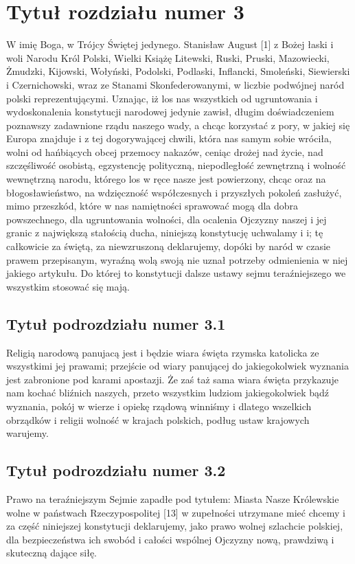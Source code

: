 \documentclass[12pt,a4paper]{article}
\begin{document}
\section{Tytuł rozdziału numer 3}
W imię Boga, w Trójcy Świętej jedynego. Stanisław August [1] z Bożej łaski i woli Narodu Król Polski, Wielki
Książę Litewski, Ruski, Pruski, Mazowiecki, Żmudzki, Kijowski, Wołyński, Podolski, Podlaski, Inflancki,
Smoleński, Siewierski i Czernichowski, wraz ze Stanami Skonfederowanymi, w liczbie podwójnej naród polski
reprezentującymi.
Uznając, iż los nas wszystkich od ugruntowania i wydoskonalenia konstytucji narodowej jedynie zawisł, długim
doświadczeniem poznawszy zadawnione rządu naszego wady, a chcąc korzystać z pory, w jakiej się Europa
znajduje i z tej dogorywającej chwili, która nas samym sobie wróciła, wolni od hańbiących obcej przemocy
nakazów, ceniąc drożej nad życie, nad szczęśliwość osobistą, egzystencję polityczną, niepodległość zewnętrzną i
wolność wewnętrzną narodu, którego los w ręce nasze jest powierzony, chcąc oraz na błogosławieństwo, na
wdzięczność współczesnych i przyszłych pokoleń zasłużyć, mimo przeszkód, które w nas namiętności
sprawować mogą dla dobra powszechnego, dla ugruntowania wolności, dla ocalenia Ojczyzny naszej i jej granic
z największą stałością ducha, niniejszą konstytucję uchwalamy i i; tę całkowicie za świętą, za niewzruszoną
deklarujemy, dopóki by naród w czasie prawem przepisanym, wyraźną wolą swoją nie uznał potrzeby
odmienienia w niej jakiego artykułu.
Do której to konstytucji dalsze ustawy sejmu teraźniejszego we wszystkim stosować się mają. 

\subsection{Tytuł podrozdziału numer 3.1}
Religią narodową panujacą jest i będzie wiara święta rzymska katolicka ze wszystkimi jej prawami; przejście od
wiary panującej do jakiegokolwiek wyznania jest zabronione pod karami apostazji. Że zaś taż sama wiara święta
przykazuje nam kochać bliźnich naszych, przeto wszystkim ludziom jakiegokolwiek bądź wyznania, pokój w
wierze i opiekę rządową winniśmy i dlatego wszelkich obrządków i religii wolność w krajach polskich, podług
ustaw krajowych warujemy. 


\subsection{Tytuł podrozdziału numer 3.2}
Prawo na teraźniejszym Sejmie zapadłe pod tytułem: Miasta Nasze Królewskie wolne w państwach
Rzeczypospolitej [13] w zupełności utrzymane mieć chcemy i za część niniejszej konstytucji deklarujemy, jako
prawo wolnej szlachcie polskiej, dla bezpieczeństwa ich swobód i całości wspólnej Ojczyzny nową, prawdziwą i
skuteczną dające siłę.
\end{document}
